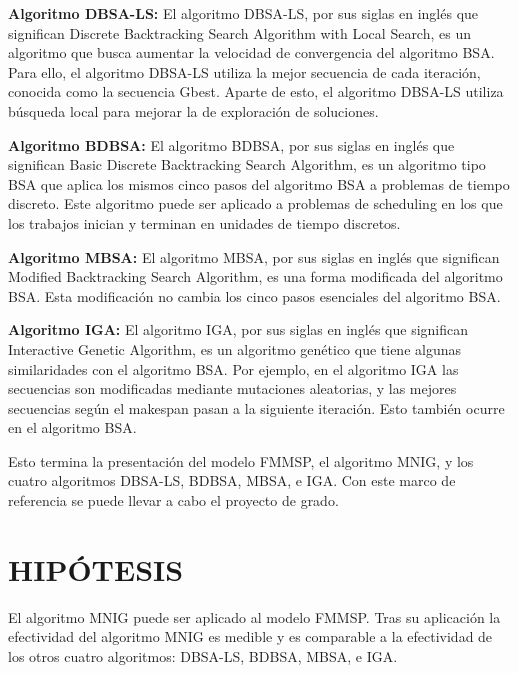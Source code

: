 \documentclass{article}
\begin{document}
\vspace{\baselineskip}
\textbf{Algoritmo DBSA-LS:} El algoritmo DBSA-LS, por sus siglas en inglés que significan Discrete Backtracking Search Algorithm with Local Search, es un algoritmo que busca aumentar la velocidad de convergencia del algoritmo BSA. Para ello, el algoritmo DBSA-LS utiliza la mejor secuencia de cada iteración, conocida como la secuencia Gbest. Aparte de esto, el algoritmo DBSA-LS utiliza búsqueda local para mejorar la de exploración de soluciones. \autocite{modFMMSP}

\vspace{\baselineskip}
\textbf{Algoritmo BDBSA:} El algoritmo BDBSA, por sus siglas en inglés que significan Basic Discrete Backtracking Search Algorithm, es un algoritmo tipo BSA que aplica los mismos cinco pasos del algoritmo BSA a problemas de tiempo discreto. Este algoritmo puede ser aplicado a problemas de scheduling en los que los trabajos inician y terminan en unidades de tiempo discretos. \autocite{modFMMSP}

\vspace{\baselineskip}
\textbf{Algoritmo MBSA:} El algoritmo MBSA, por sus siglas en inglés que significan Modified Backtracking Search Algorithm, es una forma modificada del algoritmo BSA. Esta modificación no cambia los cinco pasos esenciales del algoritmo BSA. \autocite{modFMMSP}

\vspace{\baselineskip}
\textbf{Algoritmo IGA:} El algoritmo IGA, por sus siglas en inglés que significan Interactive Genetic Algorithm, es un algoritmo genético que tiene algunas similaridades con el algoritmo BSA. Por ejemplo, en el algoritmo IGA las secuencias son modificadas mediante mutaciones aleatorias, y las mejores secuencias según el makespan pasan a la siguiente iteración. Esto también ocurre en el algoritmo BSA. \autocite{modFMMSP}

\vspace{\baselineskip}
Esto termina la presentación del modelo FMMSP, el algoritmo MNIG, y los cuatro algoritmos DBSA-LS, BDBSA, MBSA, e IGA. Con este marco de referencia se puede llevar a cabo el proyecto de grado.

\section{HIPÓTESIS}

El algoritmo MNIG puede ser aplicado al modelo FMMSP. Tras su aplicación la efectividad del algoritmo MNIG es medible y es comparable a la efectividad de los otros cuatro algoritmos: DBSA-LS, BDBSA, MBSA, e IGA.
\end{document}
